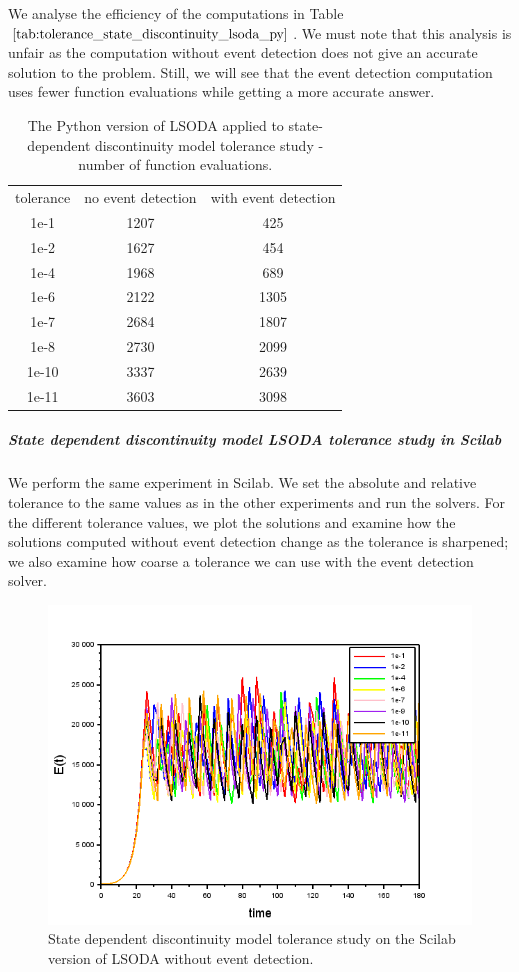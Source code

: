 We analyse the efficiency of the computations in Table $\ref{tab:tolerance_state_discontinuity_lsoda_py}$. We must note that this analysis is unfair as the computation without event detection does not give an accurate solution to the problem. Still, we will see that the event detection computation uses fewer function evaluations while getting a more accurate answer.

\begin{table}[h]
\caption {The Python version of LSODA applied to state-dependent discontinuity model tolerance study - number of function evaluations.} \label{tab:tolerance_state_discontinuity_lsoda_py} 
\begin{center}
\begin{tabular}{ c c c }
tolerance & no event detection & with event detection \\
1e-1 & 1207 & 425 \\
1e-2 & 1627 & 454 \\
1e-4 & 1968 & 689 \\
1e-6 & 2122 & 1305 \\
1e-7 & 2684 & 1807 \\
1e-8 & 2730 & 2099 \\
1e-10 & 3337 & 2639 \\
1e-11 & 3603 & 3098 \\
\end{tabular}
\end{center}
\end{table}

\subparagraph{State dependent discontinuity model LSODA tolerance study in Scilab}

We perform the same experiment in Scilab. We set the absolute and relative tolerance to the same values as in the other experiments and run the solvers. For the different tolerance values, we plot the solutions and examine how the solutions computed without event detection change as the tolerance is sharpened; we also examine how coarse a tolerance we can use with the event detection solver.

\begin{figure}[h]
\centering
\includegraphics[width=0.7\linewidth]{./figures/tolerance_state_lsoda_no_event_sci}
\caption{State dependent discontinuity model tolerance study on the Scilab version of LSODA without event detection.}
\label{fig:tolerance_state_lsoda_no_event_sci}
\end{figure}


